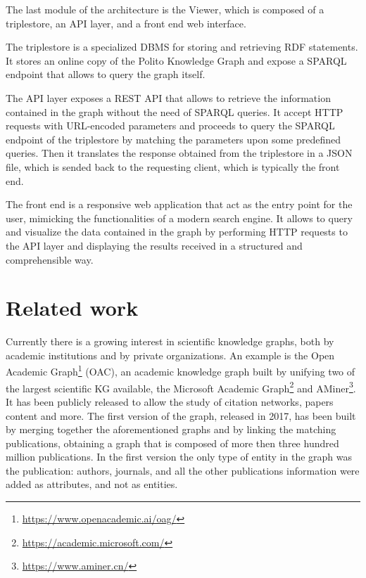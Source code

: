\documentclass[%
    corpo=13.5pt,
    twoside,
    oldstyle,
    tipotesi=magistrale,
    greek,
    evenboxes
]{toptesi}
\begin{document}
The last module of the architecture is the Viewer, which is composed of a
triplestore, an API layer, and a front end web interface.

The triplestore is a specialized DBMS for storing and retrieving RDF
statements.
It stores an online copy of the Polito Knowledge Graph and expose a
SPARQL endpoint that allows to query the graph itself.

The API layer exposes a REST API that allows to retrieve the information
contained in the graph without the need of SPARQL queries. It accept HTTP
requests with URL-encoded parameters and proceeds to query the SPARQL endpoint
of the triplestore by matching the parameters upon some predefined queries.
Then it translates the response obtained from the triplestore in a JSON file,
which is sended back to the requesting client, which is typically the front end.

The front end is a responsive web application that act as the entry point for
the user, mimicking the functionalities of a modern search engine. It allows
to query and visualize the data contained in the graph by
performing HTTP requests to the API layer and displaying the results received
in a structured and comprehensible way.




\chapter{Related work}

Currently there is a growing interest in scientific
knowledge graphs, both by academic institutions and by private organizations.
An example is the Open Academic
Graph\footnote{\url{https://www.openacademic.ai/oag/}} (OAC), an academic
knowledge graph built by unifying two of the largest
scientific KG available, the Microsoft Academic
Graph\footnote{\url{https://academic.microsoft.com/}}
and AMiner\footnote{\url{https://www.aminer.cn/}}.
It has been publicly released to allow
the study of citation networks, papers content and more.
The first version of the graph, released in 2017, has been
built by merging together the aforementioned graphs and by linking the
matching publications, obtaining a graph that is composed of more then three
hundred million publications. In the first version the only type of entity
in the graph was the publication: authors, journals, and all the other
publications information were added as attributes, and not as entities.
\end{document}
